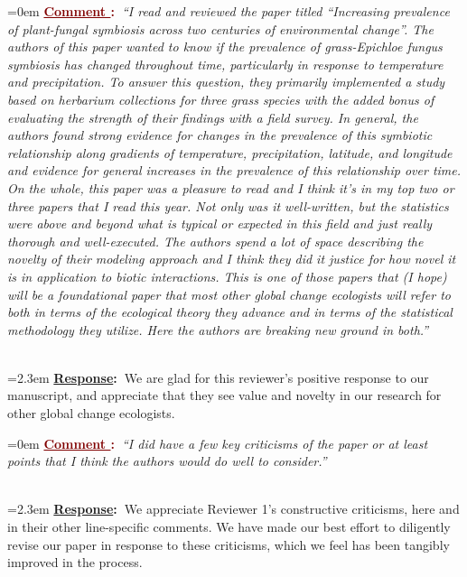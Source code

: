 \documentclass[12pt]{article}
\newcounter{cN}
\newcommand{\comment}[1]{
	\vspace{2em}
	\refstepcounter{cN} %
	\noindent \hangindent=0em \textbf{\textcolor{Maroon}{\uline{Comment \thecN}:~}}\emph{``#1''}
	}
\newcommand{\response}[1]{
	\\[0.25em]
	\hangindent=2.3em \textbf{\textcolor{NavyBlue}{\uline{Response}:~}}#1
	}
\begin{document}
\comment{I read and reviewed the paper titled “Increasing prevalence of plant-fungal symbiosis across two centuries of environmental change”. The authors of this paper wanted to know if the prevalence of grass-Epichloe fungus symbiosis has changed throughout time, particularly in response to temperature and precipitation. To answer this question, they primarily implemented a study based on herbarium collections for three grass species with the added bonus of evaluating the strength of their findings with a field survey. In general, the authors found strong evidence for changes in the prevalence of this symbiotic relationship along gradients of temperature, precipitation, latitude, and longitude and evidence for general increases in the prevalence of this relationship over time.\\
On the whole, this paper was a pleasure to read and I think it’s in my top two or three papers that I read this year. Not only was it well-written, but the statistics were above and beyond what is typical or expected in this field and just really thorough and well-executed. The authors spend a lot of space describing the novelty of their modeling approach and I think they did it justice for how novel it is in application to biotic interactions. This is one of those papers that (I hope) will be a foundational paper that most other global change ecologists will refer to both in terms of the ecological theory they advance and in terms of the statistical methodology they utilize. Here the authors are breaking new ground in both.}
\response{We are glad for this reviewer's positive response to our manuscript, and appreciate that they see value and novelty in our research for other global change ecologists.  }


\comment{I did have a few key criticisms of the paper or at least points that I think the authors would do well to consider.}
\response{We appreciate Reviewer 1's constructive criticisms, here and in their other line-specific comments. We have made our best effort to diligently revise our paper in response to these criticisms, which we feel has been tangibly improved in the process.}
\end{document}
